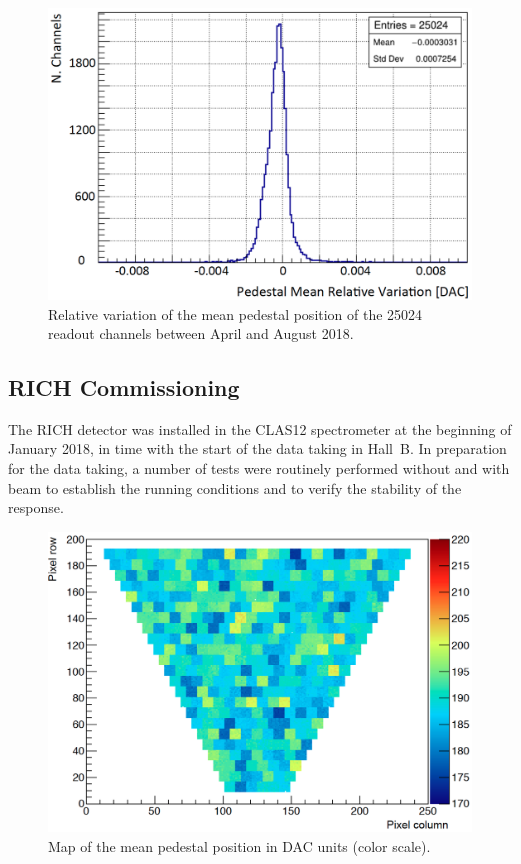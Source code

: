 \documentclass[5p,times,twocolumn]{elsarticle}
\begin{document}
\begin{figure}[t]
\begin{center}
\includegraphics[width=1.0\columnwidth]{PedestalMeanVariation.png}
\end{center}
\caption{Relative variation of the mean pedestal position of the 25024 readout channels between April and August
  2018.}
\label{fig:PedestalMean}
\end{figure}

\subsection{RICH Commissioning}
\label{sec:Commissioning}

The RICH detector was installed in the CLAS12 spectrometer at the beginning of January 2018, in time with the start
of the data taking in Hall~B. In preparation for the data taking, a number of tests were routinely performed without
and with beam to establish the running conditions and to verify the stability of the response.


\begin{figure}[t]
\begin{center}
\includegraphics[width=1.0\columnwidth]{Pedestal_map.png}
\end{center}
\caption{Map of the mean pedestal position in DAC units (color scale).}
\label{fig:PedestalMap}
\end{figure}
\end{document}
